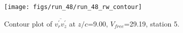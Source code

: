 \begin{figure}[H]
\centering
\texttt{[image: figs/run\_48/run\_48\_rw\_contour]}
\caption{Contour plot of $\overline{v_{r}^{\prime} v_{z}^{\prime}}$ at $z/c$=9.00, $V_{free}$=29.19, station 5.}
\label{fig:run_48_rw_contour}
\end{figure}


